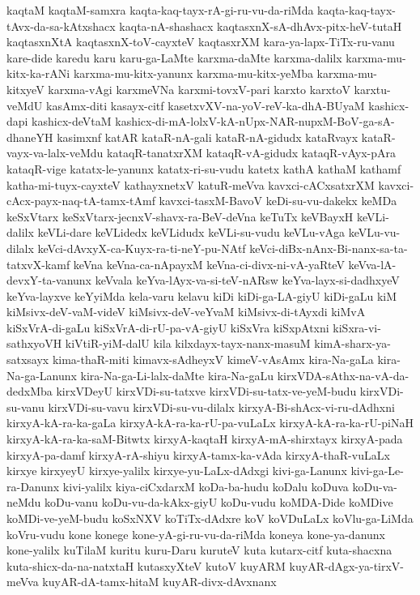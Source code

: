 {kaqtaM
kaqtaM-samxra
kaqta-kaq-tayx-rA-gi-ru-vu-da-riMda
kaqta-kaq-tayx-tAvx-da-sa-kAtxshacx
kaqta-nA-shashacx
kaqtasxnX-sA-dhAvx-pitx-heV-tutaH
kaqtasxnXtA
kaqtasxnX-toV-cayxteV
kaqtasxrXM
kara-ya-lapx-TiTx-ru-vanu
kare-dide
karedu
karu
karu-ga-LaMte
karxma-daMte
karxma-dalilx
karxma-mu-kitx-ka-rANi
karxma-mu-kitx-yanunx
karxma-mu-kitx-yeMba
karxma-mu-kitxyeV
karxma-vAgi
karxmeVNa
karxmi-tovxV-pari
karxto
karxtoV
karxtu-veMdU
kasAmx-diti
kasayx-citf
kasetxvXV-na-yoV-reV-ka-dhA-BUyaM
kashicx-dapi
kashicx-deVtaM
kashicx-di-mA-lolxV-kA-nUpx-NAR-nupxM-BoV-ga-sA-dhaneYH
kasimxnf
katAR
kataR-nA-gali
kataR-nA-gidudx
kataRvayx
kataR-vayx-va-lalx-veMdu
kataqR-tanatxrXM
kataqR-vA-gidudx
kataqR-vAyx-pAra
kataqR-vige
katatx-le-yanunx
katatx-ri-su-vudu
katetx
kathA
kathaM
kathamf
katha-mi-tuyx-cayxteV
kathayxnetxV
katuR-meVva
kavxci-cACxsatxrXM
kavxci-cAcx-payx-naq-tA-tamx-tAmf
kavxci-tasxM-BavoV
keDi-su-vu-dakekx
keMDa
keSxVtarx
keSxVtarx-jecnxV-shavx-ra-BeV-deVna
keTuTx
keVBayxH
keVLi-dalilx
keVLi-dare
keVLidedx
keVLidudx
keVLi-su-vudu
keVLu-vAga
keVLu-vu-dilalx
keVci-dAvxyX-ca-Kuyx-ra-ti-neY-pu-NAtf
keVci-diBx-nAnx-Bi-nanx-sa-ta-tatxvX-kamf
keVna
keVna-ca-nApayxM
keVna-ci-divx-ni-vA-yaRteV
keVva-lA-devxY-ta-vanunx
keVvala
keYva-lAyx-va-si-teV-nARsw
keYva-layx-si-dadhxyeV
keYva-layxve
keYyiMda
kela-varu
kelavu
kiDi
kiDi-ga-LA-giyU
kiDi-gaLu
kiM
kiMsivx-deV-vaM-videV
kiMsivx-deV-veYvaM
kiMsivx-di-tAyxdi
kiMvA
kiSxVrA-di-gaLu
kiSxVrA-di-rU-pa-vA-giyU
kiSxVra
kiSxpAtxni
kiSxra-vi-sathxyoVH
kiVtiR-yiM-dalU
kila
kilxdayx-tayx-nanx-masuM
kimA-sharx-ya-satxsayx
kima-thaR-miti
kimavx-sAdheyxV
kimeV-vAsAmx
kira-Na-gaLa
kira-Na-ga-Lanunx
kira-Na-ga-Li-lalx-daMte
kira-Na-gaLu
kirxVDA-sAthx-na-vA-da-dedxMba
kirxVDeyU
kirxVDi-su-tatxve
kirxVDi-su-tatx-ve-yeM-budu
kirxVDi-su-vanu
kirxVDi-su-vavu
kirxVDi-su-vu-dilalx
kirxyA-Bi-shAcx-vi-ru-dAdhxni
kirxyA-kA-ra-ka-gaLa
kirxyA-kA-ra-ka-rU-pa-vuLaLx
kirxyA-kA-ra-ka-rU-piNaH
kirxyA-kA-ra-ka-saM-Bitwtx
kirxyA-kaqtaH
kirxyA-mA-shirxtayx
kirxyA-pada
kirxyA-pa-damf
kirxyA-rA-shiyu
kirxyA-tamx-ka-vAda
kirxyA-thaR-vuLaLx
kirxye
kirxyeyU
kirxye-yalilx
kirxye-yu-LaLx-dAdxgi
kivi-ga-Lanunx
kivi-ga-Le-ra-Danunx
kivi-yalilx
kiya-ciCxdarxM
koDa-ba-hudu
koDalu
koDuva
koDu-va-neMdu
koDu-vanu
koDu-vu-da-kAkx-giyU
koDu-vudu
koMDA-Dide
koMDive
koMDi-ve-yeM-budu
koSxNXV
koTiTx-dAdxre
koV
koVDuLaLx
koVlu-ga-LiMda
koVru-vudu
kone
konege
kone-yA-gi-ru-vu-da-riMda
koneya
kone-ya-danunx
kone-yalilx
kuTilaM
kuritu
kuru-Daru
kuruteV
kuta
kutarx-citf
kuta-shacxna
kuta-shicx-da-na-natxtaH
kutasxyXteV
kutoV
kuyARM
kuyAR-dAgx-ya-tirxV-meVva
kuyAR-dA-tamx-hitaM
kuyAR-divx-dAvxnanx
}
